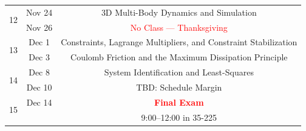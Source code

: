\documentclass[11pt,letterpaper]{article}
\begin{document}
\begin{tabular}{c|c|c}
	\multirow{2}{*}{12}  & Nov 24 &
		3D Multi-Body Dynamics and Simulation \\
	 	& Nov 26 &
	 	\textcolor{red}{No Class --- Thanksgiving} \\
	 \hline
	\multirow{2}{*}{13}  & Dec 1 &
		Constraints, Lagrange Multipliers, and Constraint Stabilization \\
	 	& Dec 3 &
	 	Coulomb Friction and the Maximum Dissipation Principle \\
	 \hline
	\multirow{2}{*}{14}  & Dec 8 &
		System Identification and Least-Squares \\
	 	& Dec 10 &
	 	TBD: Schedule Margin\\
	 	\hline
	\multirow{2}{*}{15}  & Dec 14 &
		\textcolor{red}{\textbf{Final Exam}} \\
	 	&  & 9:00--12:00 in 35-225
	 	\\

\end{tabular}
\end{document}
